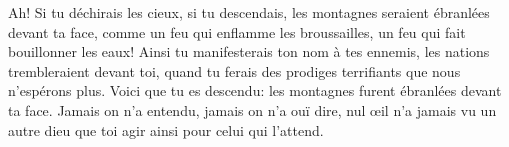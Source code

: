 Ah! Si tu déchirais les cieux, si tu descendais,
	les montagnes seraient ébranlées devant ta face,
	comme un feu qui enflamme les broussailles,
	un feu qui fait bouillonner les eaux!
Ainsi tu manifesterais ton nom à tes ennemis,
	les nations trembleraient devant toi,
	quand tu ferais des prodiges terrifiants que nous n’espérons plus.
Voici que tu es descendu: les montagnes furent ébranlées devant ta face.
Jamais on n’a entendu, jamais on n’a ouï dire,
	nul œil n’a jamais vu un autre dieu que toi agir ainsi pour celui qui l’attend.
